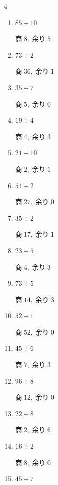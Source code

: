 \begin{multicols}{4}
\begin{enumerate}
        $商\; 0,\; 余り\; 2$

  \item $85 \div 10$

        $商\; 8,\; 余り\; 5$

  \item $73 \div 2$

        $商\; 36,\; 余り\; 1$

  \item $35 \div 7$

        $商\; 5,\; 余り\; 0$

  \item $19 \div 4$

        $商\; 4,\; 余り\; 3$

  \item $21 \div 10$

        $商\; 2,\; 余り\; 1$

  \item $54 \div 2$

        $商\; 27,\; 余り\; 0$

  \item $35 \div 2$

        $商\; 17,\; 余り\; 1$

  \item $23 \div 5$

        $商\; 4,\; 余り\; 3$

  \item $73 \div 5$

        $商\; 14,\; 余り\; 3$

\columnbreak %

  \item $52 \div 1$

        $商\; 52,\; 余り\; 0$

  \item $45 \div 6$

        $商\; 7,\; 余り\; 3$

  \item $96 \div 8$

        $商\; 12,\; 余り\; 0$

  \item $22 \div 8$

        $商\; 2,\; 余り\; 6$

  \item $16 \div 2$

        $商\; 8,\; 余り\; 0$

  \item $45 \div 7$


\end{enumerate}
\end{multicols}
